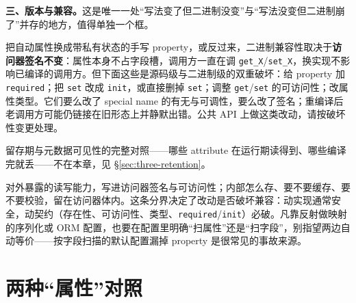 \documentclass[12pt,a4paper,fontset=fandol]{ctexbook}
\begin{document}
\textbf{三、版本与兼容。}这是唯一一处“写法变了但二进制没变”与“写法没变但二进制崩了”并存的地方，值得单独一个框。

\begin{warning}[title={改实现不破二进制，改契约必破}]
把自动属性换成带私有状态的手写 property，或反过来，二进制兼容性取决于\textbf{访问器签名不变}：属性本身不占字段槽，调用方一直在调 \texttt{get\_X}/\texttt{set\_X}，换实现不影响已编译的调用方。但下面这些是源码级与二进制级的双重破坏：给 property 加 \texttt{required}；把 \texttt{set} 改成 \texttt{init}，或直接删掉 \texttt{set}；调整 \texttt{get}/\texttt{set} 的可访问性；改属性类型。它们要么改了 special name 的有无与可调性，要么改了签名；重编译后老调用方可能仍链接在旧形态上并静默出错。公共 API 上做这类改动，请按破坏性变更处理。
\end{warning}

留存期与元数据可见性的完整对照——哪些 attribute 在运行期读得到、哪些编译完就丢——不在本章，见 \S\ref{sec:three-retention}。

\begin{bestpractice}[title={把 property 当契约写，把后备字段当私事藏}]
对外暴露的读写能力，写进访问器签名与可访问性；内部怎么存、要不要缓存、要不要校验，留在访问器体内。这条分界决定了改动是否破坏兼容：动实现通常安全，动契约（存在性、可访问性、类型、\texttt{required}/\texttt{init}）必破。凡靠反射做映射的序列化或 ORM 配置，也要在配置里明确“扫属性”还是“扫字段”，别指望两边自动等价——按字段扫描的默认配置漏掉 property 是很常见的事故来源。
\end{bestpractice}

\section{两种“属性”对照}
\label{sec:two-compare}
\end{document}

